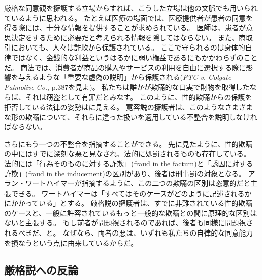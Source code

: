 \documentclass[paper=a4,book,openany]{jlreq}
\begin{document}
厳格な同意観を擁護する立場からすれば、こうした立場は他の文脈でも用いられているように思われる。
たとえば医療の場面では、医療提供者が患者の同意を得る際には、十分な情報を提供することが求められている。
医師は、患者が意思決定をするために必要だと考えられる情報を隠してはならない。
また、商取引においても、人々は詐欺から保護されている。
ここで守られるのは身体的自律ではなく、金銭的な利益というはるかに弱い権益であるにもかかわらずのことだ。
商法では、消費者が商品の購入やサービスの利用を自由に選択する際に影響を与えるような「重要な虚偽の説明」から保護される(\emph{FTC v. Colgate-Palmolive Co.}, p.387を見よ)。
私たちは誰かが欺瞞的な口実で財物を取得したならば、それは窃盗として有罪だとみなす。
このように、性的欺瞞からの保護を拒否している法律の姿勢はに見える\citep[][pp.69--71を見よ]{estrich87:_real_rape}。
寛容説の擁護者は、このようなさまざまな形の欺瞞について、それらに違った扱いを適用している不整合を説明しなければならない。

さらにもう一つの不整合を指摘することができる。
先に見たように、性的欺瞞の中にはすでに深刻な悪と見なされ、法的に処罰されるものも存在している。
法的には「行為そのものに対する詐欺」(fraud in the factum)と「誘因に対する詐欺」(fraud in the inducement)の区別があり、後者は刑事罰の対象となる。
アラン・ワートハイマーが指摘するように、この二つの欺瞞の区別は恣意的だと主張できる。
ワートハイマーは「すべてはそのケースがどのように記述されるかにかかっている」とする\citep[p.206]{wertheimer03:_consen_sexual_relat}。
厳格説の擁護者は、すでに非難されている性的欺瞞のケースと、一般に許容されているもっと一般的な欺瞞との間に原理的な区別はないと主張する。
もし前者が問題視されるのであれば、後者も同様に問題視されるべきだ、と。
なぜなら、両者の悪は、いずれも私たちの自律的な同意能力を損なうという点に由来しているからだ。

\subsection{厳格説への反論}
\end{document}
